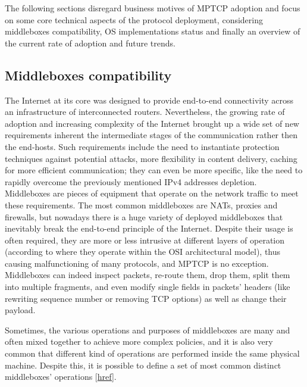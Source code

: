 The following sections disregard business motives of MPTCP adoption and focus on some core technical aspects of the protocol deployment, considering middleboxes compatibility, OS implementations status and finally an overview of the current rate of adoption and future trends.

\subsection{Middleboxes compatibility}
The Internet at its core was designed to provide end-to-end connectivity across an infrastructure of interconnected routers. Nevertheless, the growing rate of adoption and increasing complexity of the Internet brought up a wide set of new requirements inherent the intermediate stages of the communication rather then the end-hosts. Such requirements include the need to instantiate protection techniques against potential attacks, more flexibility in content delivery, caching for more efficient communication; they can even be more specific, like the need to rapidly overcome the previously mentioned IPv4 addresses depletion. Middleboxes are pieces of equipment that operate on the network traffic to meet these requirements. The most common middleboxes are NATs, proxies and firewalls, but nowadays there is a huge variety of deployed middleboxes that inevitably break the end-to-end principle of the Internet. Despite their usage is often required, they are more or less intrusive at different layers of operation (according to where they operate within the OSI architectural model), thus causing malfunctioning of many protocols, and MPTCP is no exception. Middleboxes can indeed inspect packets, re-route them, drop them, split them into multiple fragments, and even modify single fields in packets' headers (like rewriting sequence number or removing TCP options) as well as change their payload.


Sometimes, the various operations and purposes of middleboxes are many and often mixed together to achieve more complex policies, and it is also very common that different kind of operations are performed inside the same physical machine. Despite this, it is possible to define a set of most common distinct middleboxes' operations [\href{https://queue.acm.org/detail.cfm?id=2591369}{href}]. 

